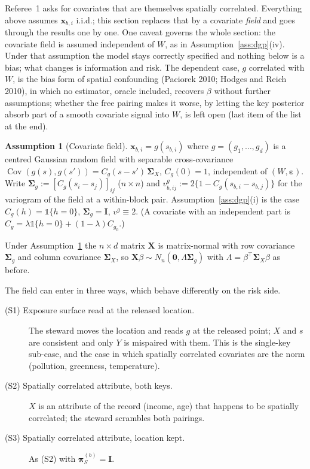 \documentclass[11pt]{article}
\theoremstyle{definition}
\newtheorem{assumption}{Assumption}
\newcommand{\bX}{\mathbf{X}}
\newcommand{\bx}{\bm{x}}\newcommand{\bg}{\bm{g}}\newcommand{\bw}{\bm{w}}\newcommand{\bz}{\bm{z}}
\newcommand{\bI}{\mathbf{I}}
\newcommand{\bzero}{\mathbf{0}}
\newcommand{\beps}{\boldsymbol{\varepsilon}}
\newcommand{\bSig}{\boldsymbol{\Sigma}}
\newcommand{\bpi}{\boldsymbol{\pi}}
\newcommand{\Cov}{\operatorname{Cov}}
\begin{document}
Referee~1 asks for covariates that are themselves spatially correlated. Everything above assumes $\bx_{b,i}$ i.i.d.; this section replaces that by a covariate \emph{field} and goes through the results one by one. One caveat governs the whole section: the covariate field is assumed independent of $W$, as in Assumption~\ref{ass:dgp}(iv). Under that assumption the model stays correctly specified and nothing below is a bias; what changes is information and risk. The dependent case, $g$ correlated with $W$, is the bias form of spatial confounding (Paciorek 2010; Hodges and Reich 2010), in which no estimator, oracle included, recovers $\beta$ without further assumptions; whether the free pairing makes it worse, by letting the key posterior absorb part of a smooth covariate signal into $W$, is left open (last item of the list at the end).

\begin{assumption}[Covariate field]\label{ass:field}
$\bx_{b,i}=g(s_{b,i})$ where $g=(g_1,\dots,g_d)$ is a centred Gaussian random field with separable cross-covariance $\Cov(g(s),g(s'))=C_g(s-s')\,\bSig_X$, $C_g(0)=1$, independent of $(W,\beps)$. Write $\bSig_g:=[C_g(s_i-s_j)]_{ij}$ ($n\times n$) and $v^g_{b,ij}:=2\{1-C_g(s_{b,i}-s_{b,j})\}$ for the variogram of the field at a within-block pair. Assumption~\ref{ass:dgp}(i) is the case $C_g(h)=\mathbb 1\{h=0\}$, $\bSig_g=\bI$, $v^g\equiv2$. (A covariate with an independent part is $C_g=\lambda\mathbb 1\{h=0\}+(1-\lambda)C_{g_0}$.)
\end{assumption}
Under Assumption~\ref{ass:field} the $n\times d$ matrix $\bX$ is matrix-normal with row covariance $\bSig_g$ and column covariance $\bSig_X$, so $\bX\beta\sim N_n(\bzero,\Lambda\bSig_g)$ with $\Lambda=\beta^\top\bSig_X\beta$ as before.

The field can enter in three ways, which behave differently on the risk side.
\begin{description}
\item[(S1) Exposure surface read at the released location.] The steward moves the location and reads $g$ at the released point; $X$ and $s$ are consistent and only $Y$ is mispaired with them. This is the single-key sub-case, and the case in which spatially correlated covariates are the norm (pollution, greenness, temperature).
\item[(S2) Spatially correlated attribute, both keys.] $X$ is an attribute of the record (income, age) that happens to be spatially correlated; the steward scrambles both pairings.
\item[(S3) Spatially correlated attribute, location kept.] As (S2) with $\bpi_S^{(b)}=\bI$.
\end{description}
\end{document}

